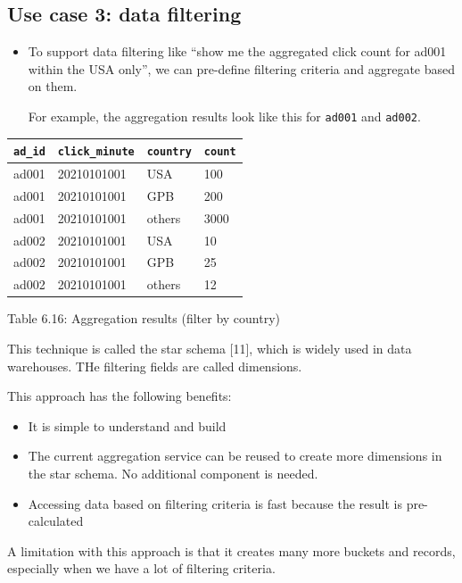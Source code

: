 \documentclass{report}
\theoremstyle{definition}
\let\oldsubsection\subsection
\renewcommand{\subsection}{\oldsubsection*}
\begin{document}
\subsection{Use case 3: data filtering}

\begin{itemize}
\item
To support data filtering like ``show me the aggregated click count for ad001 within the USA only'', we can pre-define filtering criteria and aggregate based on them.

For example, the aggregation results look like this for \lstinline|ad001| and \lstinline|ad002|.
\end{itemize}

\begin{tabular}{|p{3.5cm}|p{3.5cm}|p{3.5cm}|p{2cm}|}
\hline
\lstinline|ad_id| & \lstinline|click_minute| & \lstinline|country| & \lstinline|count| \\
\hline
ad001 & 20210101001 & USA & 100 \\
\hline
ad001 & 20210101001 & GPB & 200 \\
\hline
ad001 & 20210101001 & others & 3000 \\
\hline
ad002 & 20210101001 & USA & 10 \\
\hline
ad002 & 20210101001 & GPB & 25 \\
\hline
ad002 & 20210101001 & others & 12 \\
\hline
\end{tabular}

Table 6.16: Aggregation results (filter by country)

This technique is called the star schema [11], which is widely used in data warehouses. THe filtering fields are called dimensions.

This approach has the following benefits:

\begin{itemize}
\item
It is simple to understand and build
\item
The current aggregation service can be reused to create more dimensions in the star schema. No additional component is needed.
\item
Accessing data based on filtering criteria is fast because the result is pre-calculated
\end{itemize}

A limitation with this approach is that it creates many more buckets and records, especially when we have a lot of filtering criteria.
\end{document}
